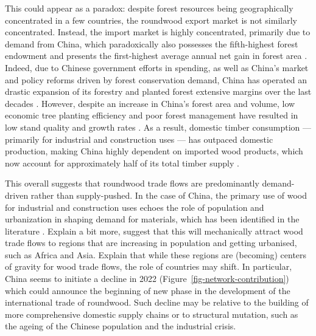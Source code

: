 \documentclass[
  authoryear,
  review,
  3p]{elsarticle}
\begin{document}
This could appear as a paradox: despite forest resources being
geographically concentrated in a few countries, the roundwood export
market is not similarly concentrated. Instead, the import market is
highly concentrated, primarily due to demand from China, which
paradoxically also possesses the fifth-highest forest endowment and
presents the first-highest average annual net gain in forest area
\citep{fao2024state}. Indeed, due to Chinese government efforts in
spending, as well as China's market and policy reforms driven by forest
conservation demand, China has operated an drastic expansion of its
forestry and planted forest extensive margins over the last decades
\citep{demurger2009forest, zhang2019china, Zhao_2022}. However, despite
an increase in China's forest area and volume, low economic tree
planting efficiency and poor forest management have resulted in low
stand quality and growth rates
\citep{hoffmann2018adapting, hou2019intensifying, zhang2019china}. As a
result, domestic timber consumption --- primarily for industrial and
construction uses --- has outpaced domestic production, making China
highly dependent on imported wood products, which now account for
approximately half of its total timber supply
\citep{demurger2009forest, he2011projection, hoffmann2018adapting, hou2019intensifying}.

This overall suggests that roundwood trade flows are predominantly
demand-driven rather than supply-pushed. In the case of China, the
primary use of wood for industrial and construction uses
\citep{hou2019intensifying} echoes the role of population and
urbanization in shaping demand for materials, which has been identified
in the literature
\citep{2021unecefao, mathieu2023meta, villamor2024preparing}. Explain a
bit more, suggest that this will mechanically attract wood trade flows
to regions that are increasing in population and getting urbanised, such
as Africa and Asia. Explain that while these regions are (becoming)
centers of gravity for wood trade flows, the role of countries may
shift. In particular, China seems to initiate a decline in 2022
(Figure~\ref{fig-network-contribution}) which could announce the
beginning of new phase in the development of the international trade of
roundwood. Such decline may be relative to the building of more
comprehensive domestic supply chains or to structural mutation, such as
the ageing of the Chinese population and the industrial crisis.
\end{document}
